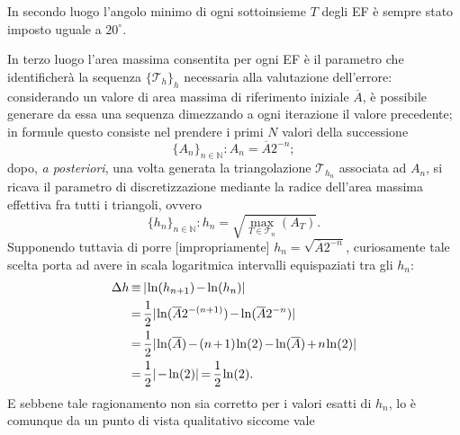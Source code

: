 \documentclass{article}
\begin{document}
            In secondo luogo l'angolo minimo di ogni sottoinsieme $T$ degli EF è sempre stato imposto uguale a $20^\circ$.
    
            In terzo luogo l'area massima consentita per ogni EF è il parametro che identificherà la sequenza $\{\mathcal T_h\}_h$ necessaria alla valutazione dell'errore: considerando un valore di area massima di riferimento iniziale $\overline A$, è possibile generare da essa una sequenza dimezzando a ogni iterazione il valore precedente; in formule questo consiste nel prendere i primi $N$ valori della successione
            \begin{equation*}
                \{A_n\}_{n\in\mathbb N}: A_n=\overline A2^{-n};
            \end{equation*}
            dopo, \textit{a posteriori}, una volta generata la triangolazione $\mathcal T_{h_n}$ associata ad $A_n$, si ricava il parametro di discretizzazione mediante la radice dell'area massima effettiva fra tutti i triangoli, ovvero
            \begin{equation*}
                \{h_n\}_{n\in\mathbb N}:h_n=\sqrt{\max_{T\in\mathcal T_n}\left(A_T\right)}.
            \end{equation*}
            Supponendo tuttavia di porre [impropriamente] $h_n=\sqrt{\overline A2^{-n}}$, curiosamente tale scelta porta ad avere in scala logaritmica intervalli equispaziati tra gli $h_n$:
            \begin{equation}
                \setlength{\thinmuskip}{1mu}
                \setlength{\medmuskip}{2mu}
                \setlength{\thickmuskip}{3mu}
                \begin{aligned}
                    \Delta h&\equiv\vert\ln(h_{n+1})-\ln(h_n)\vert\\
                    &=\frac12\vert\ln(\overline A2^{-(n+1)})-\ln(\overline A2^{-n})\vert\\
                    &=\frac12\vert\ln(\overline A)-(n+1)\ln(2)-\ln(\overline A)+n\ln(2)\vert\\
                    &=\frac12\vert-\ln(2)\vert=\frac12\ln(2).\\
                \end{aligned}
                \label{eqDimIntervalliEquispaziatiScalaLog}
            \end{equation}
            E sebbene tale ragionamento non sia corretto per i valori esatti di $h_n$, lo è comunque da un punto di vista qualitativo siccome vale 
\end{document}
